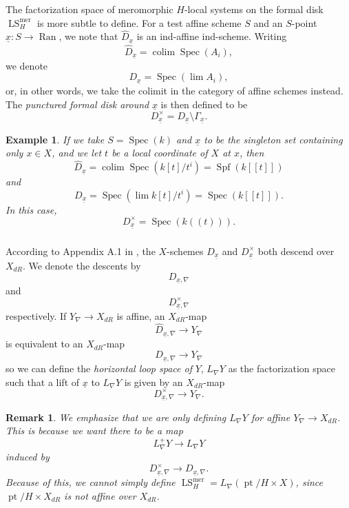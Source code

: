 \documentclass[10pt,a4paper]{amsart}
\newtheorem{rem}[subsubsection]{Remark}
\newtheorem{example}[subsubsection]{Example}
\newcommand{\on}[1]{\operatorname{#1}}
\newcommand{\Ran}{\on{Ran}}
\newcommand{\sssec}[1]{\subsubsection{}}
\begin{document}
\sssec{}
The factorization space of meromorphic $H$-local systems on the formal disk $\on{LS}_{H}^{\on{mer}}$ is more subtle to define. For a test affine scheme $S$ and an $S$-point $\underline{x} : S \to \Ran$, we note that $\hat{D}_{\underline{x}}$ is an ind-affine ind-scheme. Writing
$$
\hat{D}_{\underline{x}} = \on{colim} \on{Spec}(A_i),
$$
we denote
$$
D_{\underline{x}} = \on{Spec}(\on{lim} A_i),
$$
or, in other words, we take the colimit in the category of affine schemes instead. The \emph{punctured formal disk around} $\underline{x}$ is then defined to be
$$
D_{\underline{x}}^{\times} = D_{\underline{x}} \setminus \Gamma_{\underline{x}}.
$$

\begin{example}
    If we take $S = \on{Spec} (k)$ and $\underline{x}$ to be the singleton set containing only $x \in X$, and we let $t$ be a local coordinate of $X$ at $x$, then
    $$
    \hat{D}_{\underline{x}} = \on{colim} \on{Spec}(k[t]/t^i) = \on{Spf} (k[[t]])
    $$
    and
    $$
    D_{\underline{x}} = \on{Spec}(\on{lim} k[t]/t^i) = \on{Spec} (k[[t]]).
    $$
    In this case,
    $$
    D_{\underline{x}}^{\times} = \on{Spec} (k((t))).
    $$
\end{example}

\sssec{}
    According to Appendix A.1 in \cite{Katia}, the $X$-schemes $D_{\underline{x}}$ and $D_{\underline{x}}^{\times}$ both descend over $X_{dR}$. We denote the descents by
    $$
    D_{\underline{x}, \nabla}
    $$
    and
    $$
    D_{\underline{x}, \nabla}^{\times}
    $$
    respectively. If $Y_{\nabla} \to X_{dR}$ is affine, an $X_{dR}$-map
    $$
    \hat{D}_{\underline{x}, \nabla} \to Y_{\nabla}
    $$
    is equivalent to an $X_{dR}$-map
    $$
    D_{\underline{x}, \nabla} \to Y_{\nabla}
    $$
    so we can define the \emph{horizontal loop space of} $Y$, $L_{\nabla}Y$ as the factorization space such that a lift of $\underline{x}$ to $L_{\nabla}Y$ is given by an $X_{dR}$-map
    $$
    D_{\underline{x}, \nabla}^{\times} \to Y_{\nabla}.
    $$

\begin{rem}
We emphasize that we are only defining $L_{\nabla}Y$ for \emph{affine} $Y_{\nabla} \to X_{dR}$. This is because we want there to be a map
$$
L_{\nabla}^+Y \to L_{\nabla}Y
$$
induced by
$$
D_{\underline{x}, \nabla}^{\times} \to D_{\underline{x}, \nabla}.
$$
Because of this, we cannot simply define $\on{LS}_{H}^{\on{mer}} = L_{\nabla}(\on{pt}/H \times X)$, since $\on{pt}/H \times X_{dR}$ is not affine over $X_{dR}$.
\end{rem}
\end{document}
